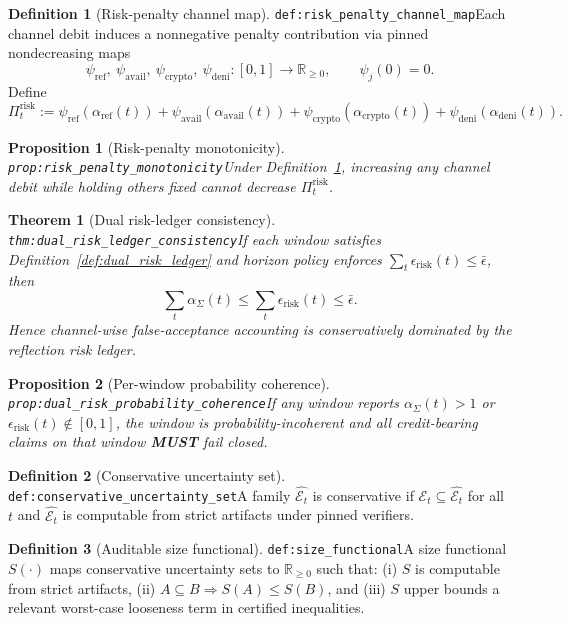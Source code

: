 \documentclass[11pt]{article}
\theoremstyle{definition}
\newtheorem{definition}{Definition}
\theoremstyle{plain}
\newtheorem{proposition}{Proposition}
\newtheorem{theorem}{Theorem}
\newcommand{\MUST}{\textbf{MUST}}
\newcommand{\lbl}[1]{\texttt{\footnotesize\nolinkurl{#1}}}
\newcommand{\DefLabel}[1]{\hfill{\small\lbl{#1}}}
\newcommand{\R}{\mathbb{R}}
\newcommand{\Et}{\mathcal{E}_t}
\newcommand{\erisk}{\epsilon_{\mathrm{risk}}}
\newcommand{\PiRisk}{\Pi^{\mathrm{risk}}}
\begin{document}
\begin{definition}[Risk-penalty channel map]\DefLabel{def:risk_penalty_channel_map}\label{def:risk_penalty_channel_map}
Each channel debit induces a nonnegative penalty contribution via pinned nondecreasing maps
\[
\psi_{\mathrm{ref}},\ \psi_{\mathrm{avail}},\ \psi_{\mathrm{crypto}},\ \psi_{\mathrm{deni}}:[0,1]\to\R_{\ge 0},\qquad \psi_j(0)=0.
\]
Define
\[
\PiRisk_t:=\psi_{\mathrm{ref}}(\alpha_{\mathrm{ref}}(t))+\psi_{\mathrm{avail}}(\alpha_{\mathrm{avail}}(t))+\psi_{\mathrm{crypto}}(\alpha_{\mathrm{crypto}}(t))+\psi_{\mathrm{deni}}(\alpha_{\mathrm{deni}}(t)).
\]
\end{definition}

\begin{proposition}[Risk-penalty monotonicity]\DefLabel{prop:risk_penalty_monotonicity}\label{prop:risk_penalty_monotonicity}
Under Definition~\ref{def:risk_penalty_channel_map}, increasing any channel debit while holding others fixed cannot decrease $\PiRisk_t$.
\end{proposition}

\begin{theorem}[Dual risk-ledger consistency]\DefLabel{thm:dual_risk_ledger_consistency}\label{thm:dual_risk_ledger_consistency}
If each window satisfies Definition~\ref{def:dual_risk_ledger} and horizon policy enforces $\sum_t \erisk(t)\le \bar\epsilon$, then
\[
\sum_t \alpha_{\Sigma}(t)\le \sum_t \erisk(t)\le \bar\epsilon.
\]
Hence channel-wise false-acceptance accounting is conservatively dominated by the reflection risk ledger.
\end{theorem}

\begin{proposition}[Per-window probability coherence]\DefLabel{prop:dual_risk_probability_coherence}\label{prop:dual_risk_probability_coherence}
If any window reports $\alpha_{\Sigma}(t)>1$ or $\erisk(t)\notin[0,1]$, the window is probability-incoherent and all credit-bearing claims on that window \MUST{} fail closed.
\end{proposition}

\begin{definition}[Conservative uncertainty set]\DefLabel{def:conservative_uncertainty_set}\label{def:conservative_uncertainty_set}
A family $\widehat{\Et}$ is conservative if $\Et \subseteq \widehat{\Et}$ for all $t$ and $\widehat{\Et}$ is computable from strict artifacts under pinned verifiers.
\end{definition}

\begin{definition}[Auditable size functional]\DefLabel{def:size_functional}\label{def:size_functional}
A size functional $S(\cdot)$ maps conservative uncertainty sets to $\R_{\ge 0}$ such that:
(i) $S$ is computable from strict artifacts, (ii) $A\subseteq B \Rightarrow S(A)\le S(B)$, and
(iii) $S$ upper bounds a relevant worst-case looseness term in certified inequalities.
\end{definition}
\end{document}
